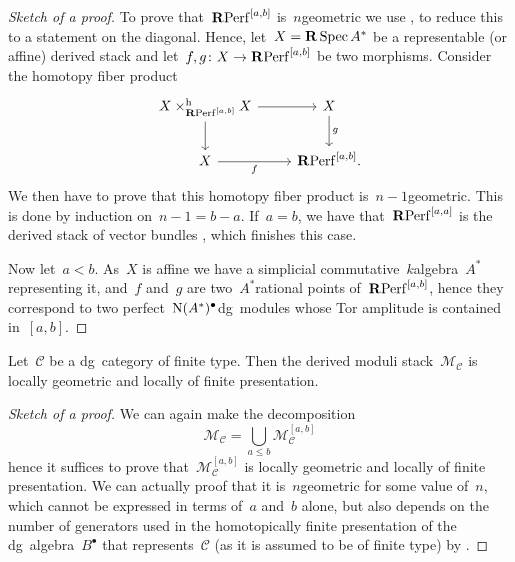 \begin{refsection}
\begin{theorem}
\begin{proof}[Sketch of a proof]
    To prove that~$\mathbf{R}\mathrm{Perf}^{[a,b]}$ is~$n$\dash geometric we use \cite[lemma 2.18]{toen-vaquie}, to reduce this to a statement on the diagonal. Hence, let~$X=\mathbf{R}\operatorname{Spec} A^*$ be a representable (or affine) derived stack and let~$f,g\colon X\to\mathbf{R}\mathrm{Perf}^{[a,b]}$ be two morphisms. Consider the homotopy fiber product
    \begin{equation}
      \begin{tikzcd}
        X\times_{\RPerf^{[a,b]}}^{\mathrm{h}}X \arrow{r} \arrow{d} & X \arrow{d}{g} \\
        X \arrow[swap]{r}{f} & \RPerf^{[a,b]}.
      \end{tikzcd}
    \end{equation}
    We then have to prove that this homotopy fiber product is~$n-1$\dash geometric. This is done by induction on~$n-1=b-a$. If~$a=b$, we have that~$\mathbf{R}\mathrm{Perf}^{[a,a]}$ is the derived stack of vector bundles \cite[corollary 1.3.7.4]{hagII}, which finishes this case.

    Now let~$a<b$. As~$X$ is affine we have a simplicial commutative~$k$\dash algebra~$A^*$ representing it, and~$f$ and~$g$ are two~$A^*$\dash rational points of~$\mathbf{R}\mathrm{Perf}^{[a,b]}$, hence they correspond to two perfect~$\operatorname{N}(A^*)^\bullet$\dash dg~modules whose Tor amplitude is contained in~$[a,b]$.

  \end{proof}
\end{theorem}

\begin{theorem}
  \label{theorem:main-theorem}
  Let~$\mathcal{C}$ be a dg~category of finite type. Then the derived moduli stack~$\mathcal{M}_{\mathcal{C}}$ is locally geometric and locally of finite presentation.

  \begin{proof}[Sketch of a proof]
    We can again make the decomposition
    \begin{equation}
      \mathcal{M}_{\mathcal{C}}=\bigcup_{a\leq b}\mathcal{M}_{\mathcal{C}}^{[a,b]}
    \end{equation}
    hence it suffices to prove that~$\mathcal{M}_{\mathcal{C}}^{[a,b]}$ is locally geometric and locally of finite presentation. We can actually proof that it is~$n$\dash geometric for some value of~$n$, which cannot be expressed in terms of~$a$ and~$b$ alone, but also depends on the number of generators used in the homotopically finite presentation of the dg~algebra~$B^\bullet$ that represents~$\mathcal{C}$ (as it is assumed to be of finite type) by \cite[corollary 2.12]{toen-vaquie}.


\end{proof}
\end{theorem}
\end{refsection}
